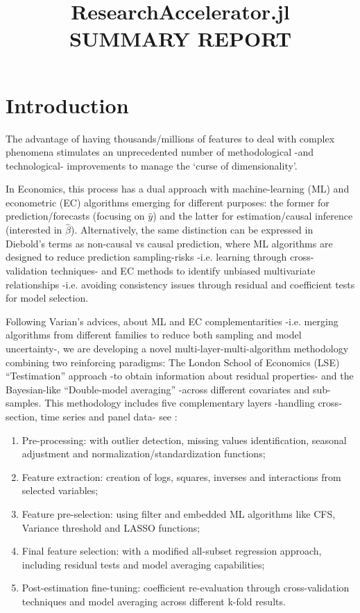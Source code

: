 \documentclass{article}
\title{ResearchAccelerator.jl \\
       \vspace{5mm} SUMMARY REPORT}
\begin{document}
\maketitle

\vspace{5mm}
\tableofcontents
\clearpage


\section{Introduction}
The advantage of having thousands/millions of features to deal with complex phenomena stimulates an unprecedented number of methodological -and technological- improvements to manage the ‘curse of dimensionality’. 

In Economics, this process has a dual approach with machine-learning (ML) and econometric (EC) algorithms emerging for different purposes: the former for prediction/forecasts (focusing on $\hat{y}$) and the latter for estimation/causal inference (interested in $\hat{\beta}$). Alternatively, the same distinction can be expressed in Diebold’s terms as non-causal vs causal prediction, where ML algorithms are designed to reduce prediction sampling-risks -i.e. learning through cross-validation techniques- and EC methods to identify unbiased multivariate relationships -i.e. avoiding consistency issues through residual and coefficient tests for model selection. 

Following Varian’s advices, about ML and EC complementarities -i.e. merging algorithms from different families to reduce both sampling and model uncertainty-, we are developing a novel multi-layer-multi-algorithm methodology combining two reinforcing paradigms: The London School of Economics (LSE) “Testimation” approach -to obtain information about residual properties- and the Bayesian-like “Double-model averaging” -across different covariates and sub-samples. This methodology includes five complementary layers -handling cross-section, time series and panel data- see \cite{gsreg2019}: 

\begin{enumerate}
    \item Pre-processing: with outlier detection, missing values identification, seasonal adjustment and normalization/standardization functions; 
    
    \item Feature extraction: creation of logs, squares, inverses and interactions from selected variables;
    
    \item Feature pre-selection: using filter and embedded ML algorithms like CFS, Variance threshold and LASSO functions; 
    
    \item Final feature selection: with a modified all-subset regression approach, including residual tests and model averaging capabilities; 
    
    \item Post-estimation fine-tuning: coefficient re-evaluation through cross-validation techniques and model averaging across different k-fold results. 
\end{enumerate}
\end{document}
